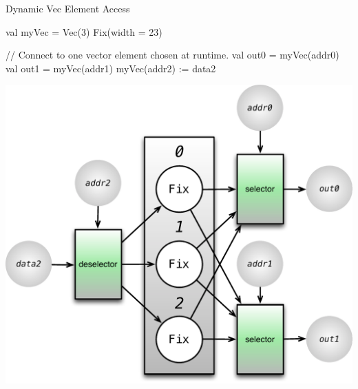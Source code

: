 \documentclass[xcolor=pdflatex,dvipsnames,table]{beamer}
\begin{document}
\begin{frame}[fragile]{Dynamic Vec Element Access}
\begin{scala}
val myVec = Vec(3) { Fix(width = 23) } 

// Connect to one vector element chosen at runtime.
val out0      = myVec(addr0)
val out1      = myVec(addr1)
myVec(addr2) := data2
\end{scala}

\begin{center}
\includegraphics[height=0.6\textheight]{figs/vec-3-dynamic.pdf} 
\end{center}
\end{frame}
\end{document}
